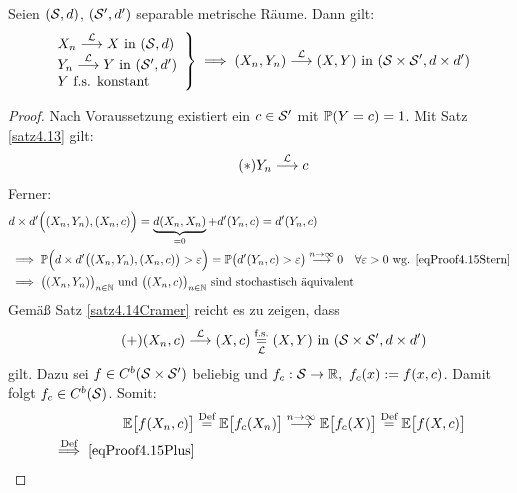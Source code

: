 \pagebreak[4]
\begin{satz}\label{satz4.15CramerSlutsky}\enter
	Seien $(\S,d)$, $(\S',d')$ separable metrische Räume. 
	Dann gilt:
	\begin{align*}
		\left.\begin{array}{l}
			X_n\stackrel{\L}{\longrightarrow} X\text{ in }(\S,d)\\
			Y_n\stackrel{\L}{\longrightarrow} Y\text{ in }(\S',d')\\
			Y\text{ f.s. konstant}
		\end{array}\right\rbrace
		\implies (X_n,Y_n)\stackrel{\L}{\longrightarrow}(X,Y)\text{ in }(\S\times\S',d\times d')
	\end{align*}
\end{satz}

\begin{proof}
	Nach Voraussetzung existiert ein $c\in\S'$ mit $\P(Y=c)=1$. 
	Mit Satz \ref{satz4.13} gilt:
	\begin{align}\label{eqProof4.15Stern}\tag{$\ast$}
		Y_n\stackrel{\L}{\longrightarrow} c
	\end{align}
	Ferner:
	\begin{align*}
		&d\times d'\Big((X_n,Y_n),(X_n,c)\Big)
		=\underbrace{d(X_n,X_n)}_{=0}+d'(Y_n,c)
		=d'(Y_n,c)\\
		&\implies\P\Big(d\times d'\big((X_n,Y_n),(X_n,c)\big)>\varepsilon\Big)
		=\P\big(d'(Y_n,c)>\varepsilon\big)
		\stackrel{n\to\infty}{\longrightarrow} 0\quad\forall\varepsilon>0\text{ wg. } \eqref{eqProof4.15Stern}\\
		&\implies
		\big((X_n,Y_n)\big)_{n\in\N}\text{ und }\big((X_n,c)\big)_{n\in\N}\text{ sind stochastisch äquivalent}
	\end{align*}
	Gemäß Satz \ref{satz4.14Cramer} reicht es zu zeigen, dass
	\begin{align}\label{eqProof4.15Plus}\tag{+}
		(X_n,c)\stackrel{\L}{\longrightarrow}(X,c)\stackrelnew{\L}{\text{f.s.}}{=}(X,Y)\text{ in }(\S\times\S',d\times d')
	\end{align}
	gilt. 
	Dazu sei $f\in C^b(\S\times\S')$ beliebig und $f_c:\S\to\R,~f_c(x):=f(x,c)$. 
	Damit folgt $f_c\in C^b(\S)$. 
	Somit:
	\begin{align*}
		\E\big[f(X_n,c)\big]
		&\stackeq{\text{Def}}
		\E\big[f_c(X_n)\big]
		\stackrel{n\to\infty}{\longrightarrow}\E\big[f_c(X)\big]\stackeq{\text{Def}}
		\E\big[f(X,c)\big]\\
		\stackrel{\text{Def}}{\implies}
		\eqref{eqProof4.15Plus}
	\end{align*}
\end{proof}

